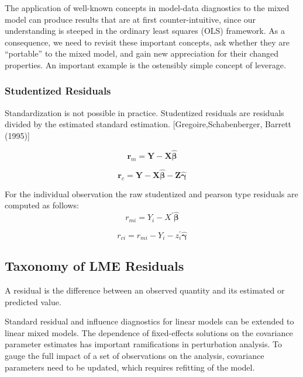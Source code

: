 \documentclass[12pt, a4paper]{report}
\theoremstyle{plain}
\theoremstyle{definition}
\theoremstyle{remark}
\begin{document}
	The application of well-known concepts in model-data diagnostics to the mixed model can produce results
	that are at first counter-intuitive, since our understanding is steeped in the ordinary least squares
	(OLS) framework. As a consequence, we need to revisit these important concepts, ask whether they
	are “portable” to the mixed model, and gain new appreciation for their changed properties. An important
	example is the ostensibly simple concept of leverage. 
	
	
	\subsubsection{Studentized Residuals}
	Standardization is not possible in practice. Studentized residuals are residuals divided by the estimated standard estimation.
	[Gregoire,Schabenberger, Barrett (1995)]
	
	\[\boldsymbol{r}_{m} = \boldsymbol{Y} -  \boldsymbol{X} \boldsymbol{\hat{\beta}} \]
	
	\[\boldsymbol{r}_{c} = \boldsymbol{Y} -  \boldsymbol{X} \boldsymbol{\hat{\beta}} -  \boldsymbol{Z} \boldsymbol{\hat{\gamma}}\]
	
	For the individual observation the raw studentized and pearson type residuals are computed as follows:
	\[r_{mi} =Y_{i} -X^{\prime} \boldsymbol{\hat{\beta}}\]
	
	\[r_{ci} = r_{mi} - Y_{i} - z_{i}^{\prime} \boldsymbol{\hat{\gamma}}\]
	
	

	\subsection{Taxonomy of LME Residuals}
	A residual is the difference between an observed quantity and its estimated or predicted value. 
	
	Standard residual and influence diagnostics for linear models can
	be extended to linear mixed models. The dependence of
	fixed-effects solutions on the covariance parameter estimates has
	important ramifications in perturbation analysis. To gauge the
	full impact of a set of observations on the analysis, covariance
	parameters need to be updated, which requires refitting of the
	model.
	
\end{document}
